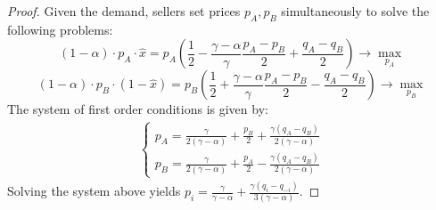 \documentclass[a4paper]{article}
\begin{document}
\begin{proof}
	 
	 
	 
	 Given the demand, 	sellers set prices $p_A, p_B$ simultaneously to solve the following problems:
	 $$(1-\alpha)\cdot p_A \cdot \hat{x} = p_A \left(\frac{1}{2} - \frac{\gamma - \alpha}{\gamma} \frac{p_A - p_B}{2} + \frac{q_A - q_B}{2}\right) \to \underset{p_A}{\max}$$
	 $$(1-\alpha)\cdot p_B \cdot (1-\hat{x}) = p_B \left(\frac{1}{2} + \frac{\gamma - \alpha}{\gamma} \frac{p_A - p_B}{2} - \frac{q_A - q_B}{2}\right) \to \underset{p_B}{\max}$$
	 The system of first order conditions is given by:
	 \begin{align*}
	 \begin{cases}
	 p_A = \frac{\gamma}{2(\gamma - \alpha)} + \frac{p_B}{2} + \frac{\gamma(q_A - q_B)}{2(\gamma - \alpha)}\\
	 p_B = \frac{\gamma}{2(\gamma - \alpha)} + \frac{p_A}{2} - \frac{\gamma(q_A - q_B)}{2(\gamma - \alpha)}
	 \end{cases}
	 \end{align*}
	 Solving the system above yields $p_i = \frac{\gamma}{\gamma - \alpha} + \frac{\gamma(q_i - q_{-i})}{3(\gamma - \alpha)}$.
	 
	 
	 

\end{proof}
\end{document}
